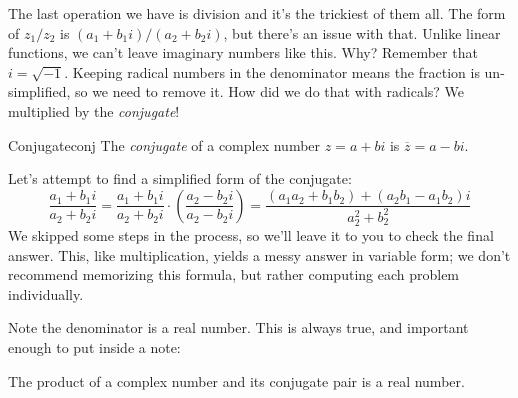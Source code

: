 \documentclass[../book.tex]{subfiles}
\begin{document}
The last operation we have is division and it's the trickiest of them all.  The form of $z_1/z_2$ is $\left(a_1+b_1i\right)/\left(a_2+b_2i\right)$, but there's an issue with that.  Unlike linear functions, we can't leave imaginary numbers like this.  Why?  Remember that $i=\sqrt{-1}$.  Keeping radical numbers in the denominator means the fraction is un-simplified, so we need to remove it.  How did we do that with radicals?  We multiplied by the \textit{conjugate}!
\begin{definition}{Conjugate}{conj}
The \textit{conjugate} of a complex number $z=a+bi$ is $\overline{z}=a-bi$.  
\end{definition}
\noindent Let's attempt to find a simplified form of the conjugate: $$\frac{a_1+b_1i}{a_2+b_2i}=\frac{a_1+b_1i}{a_2+b_2i}\cdot \left(\frac{a_2-b_2i}{a_2-b_2i}\right)=\frac{\left(a_1a_2+b_1b_2\right)+\left(a_2b_1-a_1b_2\right)i}{a_2^2+b_2^2}$$
We skipped some steps in the process, so we'll leave it to you to check the final answer.  This, like multiplication, yields a messy answer in variable form; we don't recommend memorizing this formula, but rather computing each problem individually.

Note the denominator is a real number.  This is always true, and important enough to put inside a note:
\begin{note}
The product of a complex number and its conjugate pair is a real number.
\end{note}
\end{document}
